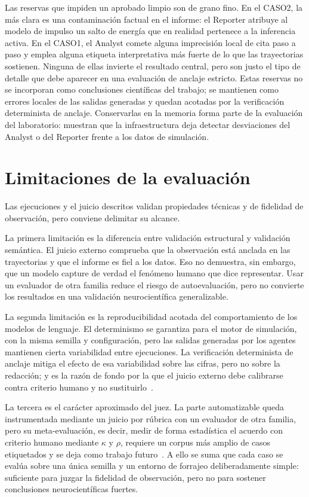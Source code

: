 Las reservas que impiden un aprobado limpio son de grano fino. En el CASO2, la
más clara es una contaminación factual en el informe: el Reporter atribuye al
modelo de impulso un salto de energía que en realidad pertenece a la inferencia
activa. En el CASO1, el Analyst comete alguna imprecisión local de cita paso a
paso y emplea alguna etiqueta interpretativa más fuerte de lo que las
trayectorias sostienen. Ninguna de ellas invierte el resultado central, pero son
justo el tipo de detalle que debe aparecer en una evaluación de anclaje estricto.
Estas reservas no se incorporan como conclusiones científicas del trabajo; se
mantienen como errores locales de las salidas generadas y quedan acotadas por la
verificación determinista de anclaje. Conservarlas en la memoria forma parte de
la evaluación del laboratorio: muestran que la infraestructura deja detectar
desviaciones del Analyst o del Reporter frente a los datos de simulación.

\section{Limitaciones de la evaluación}

Las ejecuciones y el juicio descritos validan propiedades técnicas y de fidelidad
de observación, pero conviene delimitar su alcance.

La primera limitación es la diferencia entre validación estructural y validación
semántica. El juicio externo comprueba que la observación está anclada en las
trayectorias y que el informe es fiel a los datos. Eso no demuestra, sin embargo,
que un modelo capture de verdad el fenómeno humano que dice representar. Usar
un evaluador de otra familia reduce el riesgo de autoevaluación, pero no
convierte los resultados en una validación neurocientífica generalizable.

La segunda limitación es la reproducibilidad acotada del comportamiento de los
modelos de lenguaje. El determinismo se garantiza para el motor de simulación,
con la misma semilla y configuración, pero las salidas generadas por los agentes
mantienen cierta variabilidad entre ejecuciones. La verificación determinista de
anclaje mitiga el efecto de esa variabilidad sobre las cifras, pero no sobre la
redacción; y es la razón de fondo por la que el juicio externo debe calibrarse
contra criterio humano y no sustituirlo~\cite{zheng2023judge}.

La tercera es el carácter aproximado del juez. La parte automatizable queda
instrumentada mediante un juicio por rúbrica con un evaluador de otra familia, pero
su meta-evaluación, es decir, medir de forma estadística el acuerdo con
criterio humano mediante $\kappa$ y $\rho$, requiere un corpus más amplio de
casos etiquetados y se deja como trabajo futuro~\cite{li2024judges}. A ello se
suma que cada caso se evalúa sobre una única semilla y un entorno de forrajeo
deliberadamente simple: suficiente para juzgar la fidelidad de observación, pero
no para sostener conclusiones neurocientíficas fuertes.

